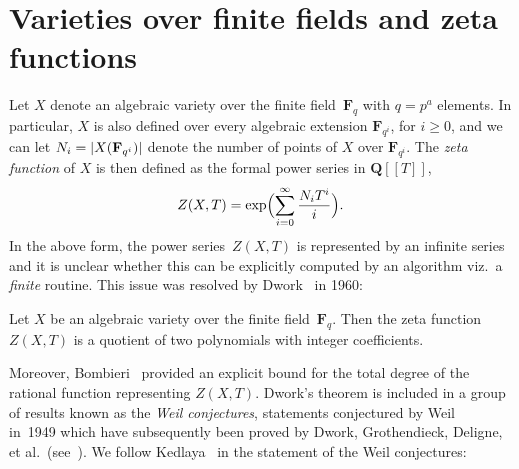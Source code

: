 

\section{Varieties over finite fields and zeta functions}

Let $X$ denote an algebraic variety over the finite field~$\mathbf{F}_q$ 
with $q = p^a$ elements.  In particular, $X$ is also defined 
over every algebraic extension $\mathbf{F}_{q^i}$, for $i \geq 0$, 
and we can let $N_i = \lvert X(\mathbf{F}_{q^i}) \rvert$ denote the number 
of points of $X$ over $\mathbf{F}_{q^i}$.  The \emph{zeta function} 
of $X$ is then defined as the formal power series in $\mathbf{Q}[[T]]$,
\begin{equation*}
Z(X, T) = \exp \Bigl( \sum_{i=0}^{\infty} \frac{N_i T^i}{i} \Bigr).
\end{equation*}
In the above form, the power series~$Z(X, T)$ is represented by an 
infinite series and it is unclear whether this can be explicitly 
computed by an algorithm viz.\ a \emph{finite} routine.  This issue 
was resolved by Dwork~\citep{Dwork1960} in 1960:

\begin{thm}
Let $X$ be an algebraic variety over the finite field~$\mathbf{F}_q$.  
Then the zeta function $Z(X, T)$ is a quotient of two polynomials with 
integer coefficients.
\end{thm}

Moreover, Bombieri~\citep{Bombieri1978} provided an explicit bound 
for the total degree of the rational function representing $Z(X, T)$.
Dwork's theorem is included in a group of results known as the 
\emph{Weil conjectures}, statements conjectured by Weil~\citep{Weil1949} 
in~1949 which have subsequently been proved by Dwork, Grothendieck, 
Deligne, et al.\ (see~\citep[Appendix~C]{Har77}).  We follow 
Kedlaya~\citep[Theorem~1.2.1]{Kedlaya2011} in the statement of the Weil 
conjectures:

